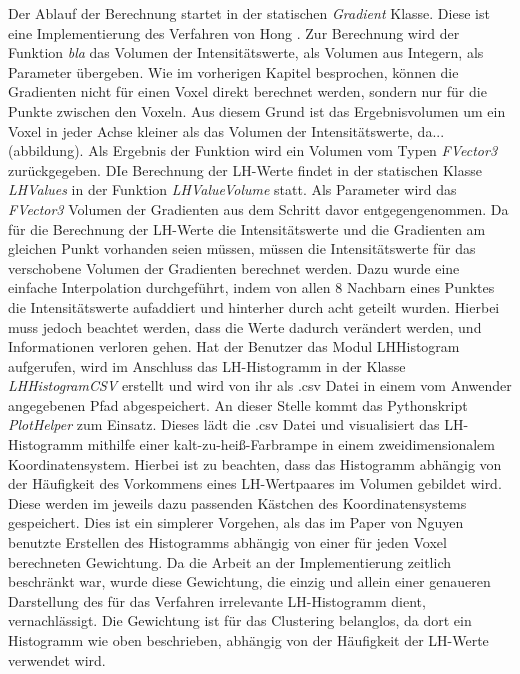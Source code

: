 Der Ablauf der Berechnung startet in der statischen \textit{Gradient} Klasse. Diese ist eine Implementierung des Verfahren von Hong \cite{hong2003method}. Zur Berechnung wird der Funktion \textit{bla} das Volumen der Intensitätswerte, als Volumen aus Integern, als Parameter übergeben. Wie im vorherigen Kapitel besprochen, können die Gradienten nicht für einen Voxel direkt berechnet werden, sondern nur für die Punkte zwischen den Voxeln. Aus diesem Grund ist das Ergebnisvolumen um ein Voxel in jeder Achse kleiner als das Volumen der Intensitätswerte, da... (abbildung). Als Ergebnis der Funktion wird ein Volumen vom Typen \textit{FVector3} zurückgegeben.
\newline
DIe Berechnung der LH-Werte findet in der statischen Klasse \textit{LHValues} in der Funktion \textit{LHValueVolume} statt. Als Parameter wird das \textit{FVector3} Volumen der Gradienten aus dem Schritt davor entgegengenommen. Da für die Berechnung der LH-Werte die Intensitätswerte und die Gradienten am gleichen Punkt vorhanden seien müssen, müssen die Intensitätswerte für das verschobene Volumen der Gradienten berechnet werden. Dazu wurde eine einfache Interpolation durchgeführt, indem von allen 8 Nachbarn eines Punktes die Intensitätswerte aufaddiert und hinterher durch acht geteilt wurden. Hierbei muss jedoch beachtet werden, dass die Werte dadurch verändert werden, und Informationen verloren gehen.
\newline
Hat der Benutzer das Modul LHHistogram aufgerufen, wird im Anschluss das LH-Histogramm in der Klasse \textit{LHHistogramCSV} erstellt und wird von ihr als .csv Datei in einem vom Anwender angegebenen Pfad abgespeichert.
\newline
An dieser Stelle kommt das Pythonskript \textit{PlotHelper} zum Einsatz. Dieses lädt die .csv Datei und visualisiert das LH-Histogramm mithilfe einer kalt-zu-heiß-Farbrampe in einem zweidimensionalem Koordinatensystem.
\newline
Hierbei ist zu beachten, dass das Histogramm abhängig von der Häufigkeit des Vorkommens eines LH-Wertpaares im Volumen gebildet wird. Diese werden im jeweils dazu passenden Kästchen des Koordinatensystems gespeichert. Dies ist ein simplerer Vorgehen, als das im Paper von Nguyen \cite{nguyen2012clustering} benutzte Erstellen des Histogramms abhängig von einer für jeden Voxel berechneten Gewichtung. Da die Arbeit an der Implementierung zeitlich beschränkt war, wurde diese Gewichtung, die einzig und allein einer genaueren Darstellung des für das Verfahren irrelevante LH-Histogramm dient, vernachlässigt. Die Gewichtung ist für das Clustering belanglos, da dort ein Histogramm wie oben beschrieben, abhängig von der Häufigkeit der LH-Werte verwendet wird. 
